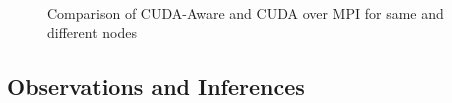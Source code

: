 \documentclass[10pt]{article}
\begin{document}
\begin{figure}[p]
\centering
        ~
      
    \caption{Comparison of CUDA-Aware and CUDA over MPI for same and different nodes}
   \label{cuda}
\end{figure}

\subsection{Observations and Inferences}
\end{document}
